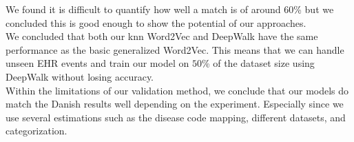 We found it is difficult to quantify how well a match is of around $60$\% but we concluded this is good enough to show the potential of our approaches. \\

We concluded that both our knn Word2Vec and DeepWalk have the same performance as the basic generalized Word2Vec. This means that we can handle unseen EHR events and train our model on $50$\% of the dataset size using DeepWalk without losing accuracy. \\

Within the limitations of our validation method, we conclude that our models do match the Danish results well depending on the experiment. Especially since we use several estimations such as the disease code mapping, different datasets, and categorization. 



